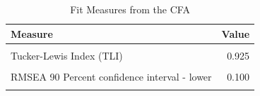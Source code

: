 \documentclass[
]{article}
\begin{document}
\begin{table}[!h]

\caption{\label{tab:unnamed-chunk-14}Fit Measures from the CFA}
\centering
\begin{tabular}[t]{lr}
\toprule
Measure & Value\\
\midrule
\cellcolor{gray!6}{Comparative Fit Index (CFI)} & \cellcolor{gray!6}{0.954}\\
Tucker-Lewis Index (TLI) & 0.925\\
\cellcolor{gray!6}{Root Mean Square Error of Approximation(RMSEA)} & \cellcolor{gray!6}{0.074}\\
RMSEA 90 Percent confidence interval - lower & 0.100\\
\cellcolor{gray!6}{RMSEA 90 Percent confidence interval - upper} & \cellcolor{gray!6}{0.050}\\
\bottomrule
\end{tabular}
\end{table}

\newpage
\end{document}
